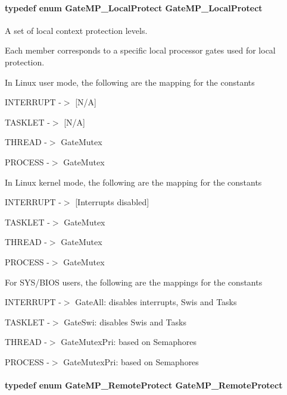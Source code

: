 \paragraph[{GateMP\_\-LocalProtect}]{\setlength{\rightskip}{0pt plus 5cm}typedef enum {\bf GateMP\_\-LocalProtect}  {\bf GateMP\_\-LocalProtect}}\hfill\label{_gate_m_p_8h_accb7b6c936aebe10e31d909310398fe5}


A set of local context protection levels. 

Each member corresponds to a specific local processor gates used for local protection.

In Linux user mode, the following are the mapping for the constants
\begin{DoxyItemize}
\item INTERRUPT -\/$>$ \mbox{[}N/A\mbox{]}
\item TASKLET -\/$>$ \mbox{[}N/A\mbox{]}
\item THREAD -\/$>$ GateMutex
\item PROCESS -\/$>$ GateMutex
\end{DoxyItemize}

In Linux kernel mode, the following are the mapping for the constants
\begin{DoxyItemize}
\item INTERRUPT -\/$>$ \mbox{[}Interrupts disabled\mbox{]}
\item TASKLET -\/$>$ GateMutex
\item THREAD -\/$>$ GateMutex
\item PROCESS -\/$>$ GateMutex
\end{DoxyItemize}

For SYS/BIOS users, the following are the mappings for the constants
\begin{DoxyItemize}
\item INTERRUPT -\/$>$ GateAll: disables interrupts, Swis and Tasks
\item TASKLET -\/$>$ GateSwi: disables Swis and Tasks
\item THREAD -\/$>$ GateMutexPri: based on Semaphores
\item PROCESS -\/$>$ GateMutexPri: based on Semaphores 
\end{DoxyItemize}
\paragraph[{GateMP\_\-RemoteProtect}]{\setlength{\rightskip}{0pt plus 5cm}typedef enum {\bf GateMP\_\-RemoteProtect}  {\bf GateMP\_\-RemoteProtect}}\hfill\label{_gate_m_p_8h_a1400ba94db5b5fefd196649a9c9a4c63}


